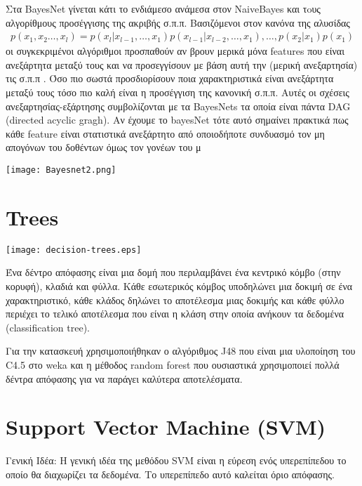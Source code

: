Στα BayesΝet γίνεται κάτι το ενδιάμεσο ανάμεσα στον NaiveBayes και τoυς αλγορίθμους προσέγγισης της ακριβής σ.π.π. 
Βασιζόμενοι στον κανόνα της αλυσίδας
\begin{align*}
p(x_1,x_2 \ldots ,x_l) = p(x_l|x_{l-1},\ldots,x_1)p(x_{l-1}|x_{l-2},\ldots,x_1),\ldots,p(x_2|x_1)p(x_1)
\end{align*} 
οι συγκεκριμένοι αλγόριθμοι προσπαθούν αν βρουν μερικά μόνα features που είναι ανεξάρτητα μεταξύ τους και να προσεγγίσουν με βάση αυτή την (μερική ανεξαρτησία) τις σ.π.π .
Όσο πιο σωστά προσδιορίσουν ποια χαρακτηριστικά είναι ανεξάρτητα μεταξύ τους τόσο πιο καλή είναι η προσέγγιση της κανονική σ.π.π.
Αυτές οι σχέσεις ανεξαρτησίας-εξάρτησης συμβολίζονται με τα BayesNets τα οποία είναι πάντα DAG (directed acyclic gragh).
Αν έχουμε το bayesNet τότε αυτό σημαίνει πρακτικά πως κάθε feature  είναι στατιστικά ανεξάρτητο από οποιοδήποτε συνδυασμό τον μη απογόνων του δοθέντων όμως τον γονέων του μ
\begin{center}
	\texttt{[image: Bayesnet2.png]}
	\label{fig:BayesNet}  
\end{center}

\section{Trees}
\begin{center}
    \texttt{[image: decision-trees.eps]}
    \label{fig:decision-tree}
\end{center}

Ένα δέντρο απόφασης είναι μια δομή που περιλαμβάνει ένα κεντρικό κόμβο (στην κορυφή), κλαδιά και φύλλα.
Κάθε εσωτερικός κόμβος υποδηλώνει μια δοκιμή σε ένα χαρακτηριστικό,
κάθε κλάδος δηλώνει το αποτέλεσμα μιας δοκιμής
και κάθε φύλλο περιέχει το τελικό αποτέλεσμα που είναι η κλάση στην οποία ανήκουν τα δεδομένα (classification tree).

Για την κατασκευή χρησιμοποιήθηκαν ο αλγόριθμος J48 που είναι μια υλοποίηση του C4.5 στο weka
και η μέθοδος random forest που ουσιαστικά χρησιμοποιεί πολλά δέντρα απόφασης για να παράγει καλύτερα αποτελέσματα.



\section{Support Vector Machine (SVM)}
Γενική Ιδέα:
H γενική ιδέα της μεθόδου SVM είναι η εύρεση ενός υπερεπίπεδου το οποίο θα διαχωρίζει τα δεδομένα.
Το υπερεπίπεδο αυτό καλείται όριο απόφασης. 

